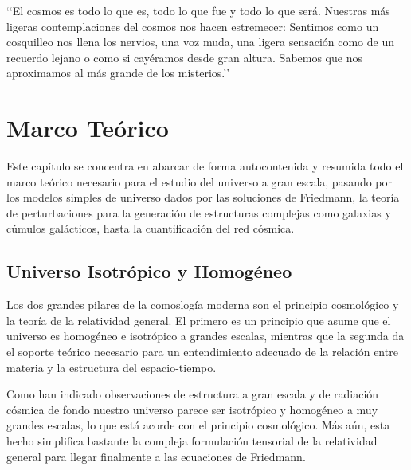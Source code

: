 \begin{savequote}[50mm]
‘‘El cosmos es todo lo que es, todo lo que fue y todo lo que será. Nuestras 
más ligeras contemplaciones del cosmos nos hacen estremecer: Sentimos como 
un cosquilleo nos llena los nervios, una voz muda, una ligera sensación como
de un recuerdo lejano o como si cayéramos desde gran altura. Sabemos que nos
aproximamos al más grande de los misterios.’’
\end{savequote}




\chapter{Marco Teórico}
\label{cha:Theoretical Framework}


Este capítulo se concentra en abarcar de forma autocontenida y resumida 
todo el marco teórico necesario para el estudio del universo a gran escala,
pasando por los modelos simples de universo dados por las soluciones de 
Friedmann, la teoría de perturbaciones para la generación de estructuras
complejas como galaxias y cúmulos galácticos, hasta la cuantificación del 
red cósmica.




\section{Universo Isotrópico y Homogéneo}
\label{sec:IsotropicAndHomogeneousUniverse}


Los dos grandes pilares de la comoslogía moderna son el principio 
cosmológico y la teoría de la relatividad general. El primero es un 
principio que asume que el universo es homogéneo e isotrópico a grandes 
escalas, mientras que la segunda da el soporte teórico necesario para un 
entendimiento adecuado de la relación entre materia y la estructura del 
espacio-tiempo.


Como han indicado observaciones de estructura a gran escala y de radiación
cósmica de fondo nuestro universo parece ser isotrópico y homogéneo a muy
grandes escalas, lo que está acorde con el principio cosmológico. Más aún, 
esta hecho simplifica bastante la compleja formulación tensorial de la 
relatividad general para llegar finalmente a las ecuaciones de Friedmann.


